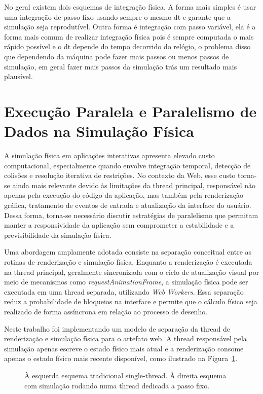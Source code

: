 No geral existem dois esquemas de integração física. A forma mais simples é usar uma integração de passo fixo usando sempre o mesmo dt e garante que a simulação seja reprodutível. Outra forma é integração com passo variável, ela é a forma mais comum de realizar integração física pois é sempre computada o mais rápido possível e o dt depende do tempo decorrido do relógio, o problema disso que dependendo da máquina pode fazer mais passos ou menos passos de simulação, em geral fazer mais passos da simulação trás um resultado mais plausível. 

\section{Execução Paralela e Paralelismo de Dados na Simulação Física}

A simulação física em aplicações interativas apresenta elevado custo computacional, especialmente quando envolve integração temporal, detecção de colisões e resolução iterativa de restrições. No contexto da Web, esse custo torna-se ainda mais relevante devido às limitações da thread principal, responsável não apenas pela execução do código da aplicação, mas também pela renderização gráfica, tratamento de eventos de entrada e atualização da interface do usuário. Dessa forma, torna-se necessário discutir estratégias de paralelismo que permitam manter a responsividade da aplicação sem comprometer a estabilidade e a previsibilidade da simulação física.

Uma abordagem amplamente adotada consiste na separação conceitual entre as rotinas de renderização e simulação física. Enquanto a renderização é executada na thread principal, geralmente sincronizada com o ciclo de atualização visual por meio de mecanismos como \textit{requestAnimationFrame}, a simulação física pode ser executada em uma thread separada, utilizando \textit{Web Workers}. Essa separação reduz a probabilidade de bloqueios na interface e permite que o cálculo físico seja realizado de forma assíncrona em relação ao processo de desenho.

Neste trabalho foi implementando um modelo de separação da thread de renderização e simulação física para o artefato web. A thread responsável pela simulação apenas escreve o estado físico mais atual e a renderização consome apenas o estado físico mais recente disponível, como ilustrado na Figura~\ref{fig:diagrama-threaded}.

\begin{figure}[htb]
	\centering
	
	\caption{À esquerda esquema tradicional single-thread. À direita esquema com simulação rodando numa thread dedicada a passo fixo.}
	\label{fig:diagrama-threaded}
\end{figure}

